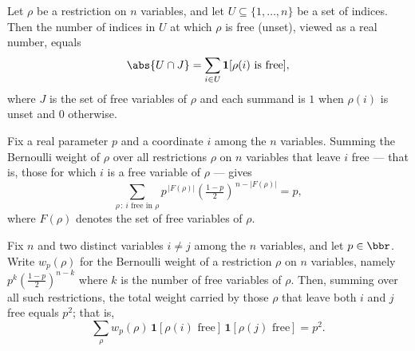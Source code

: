 \begin{lemma}
\label{RestrictionFourier.card_inter_eq_sum}
\leanok
{}
Let $\rho$ be a restriction on $n$ variables, and let $U \subseteq \{1,\dots,n\}$ be a
set of indices. Then the number of indices in $U$ at which $\rho$ is free (unset),
viewed as a real number, equals
\[
\abs{U \cap J} = \sum_{i \in U} \mathbf{1}[\rho(i)\ \text{is free}],
\]
where $J$ is the set of free variables of $\rho$ and each summand is $1$ when $\rho(i)$
is unset and $0$ otherwise.
\end{lemma}

\begin{lemma}
\label{RestrictionFourier.expectation_free_indicator}
\leanok
{}
Fix a real parameter $p$ and a coordinate $i$ among the $n$ variables. Summing the
Bernoulli weight of $\rho$ over all restrictions $\rho$ on $n$ variables that leave $i$
free — that is, those for which $i$ is a free variable of $\rho$ — gives
\[
\sum_{\rho \,:\, i \text{ free in } \rho}
p^{\,|F(\rho)|}\left(\tfrac{1-p}{2}\right)^{\,n-|F(\rho)|} = p,
\]
where $F(\rho)$ denotes the set of free variables of $\rho$.
\end{lemma}

\begin{lemma}
\label{RestrictionFourier.expectation_free_indicator_pair}
\leanok
{}
Fix $n$ and two distinct variables $i \neq j$ among the $n$ variables, and let $p \in
\bbr$. Write $w_p(\rho)$ for the Bernoulli weight of a restriction $\rho$ on $n$
variables, namely $p^{k}\left(\tfrac{1-p}{2}\right)^{n-k}$ where $k$ is the number of
free variables of $\rho$. Then, summing over all such restrictions, the total weight
carried by those $\rho$ that leave both $i$ and $j$ free equals $p^2$; that is,
\[
\sum_{\rho} w_p(\rho)\,\mathbf{1}[\rho(i)\text{ free}]\,\mathbf{1}[\rho(j)\text{ free}]
= p^2.
\]
\end{lemma}

